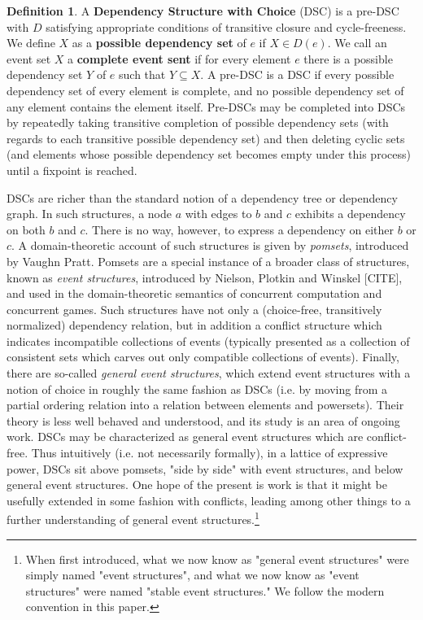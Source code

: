 \documentclass[hoptionsi,review,format=acmsmall]{acmart}
\theoremstyle{definition}
\newtheorem{definition}{Definition}[section]
\begin{document}
\begin{definition}
A \textbf{Dependency Structure with Choice} (DSC) is a pre-DSC with \(D\) satisfying  appropriate conditions of transitive closure and cycle-freeness. We define \(X\) as a \textbf{possible dependency set} of \(e\) if \(X \in D(e)\). We call an event set \(X\) a \textbf{complete event sent} if for every element \(e\) there is a possible dependency set \(Y\) of \(e\) such that \(Y \subseteq X\). A pre-DSC is a DSC if every possible dependency set of every element is complete, and no possible dependency set of any element contains the element itself. Pre-DSCs may be completed into DSCs by repeatedly taking transitive completion of possible dependency sets (with regards to each transitive possible dependency set) and then deleting cyclic sets (and elements whose possible dependency set becomes empty under this process) until a fixpoint is reached.
\end{definition}

DSCs are richer than the standard notion of a dependency tree or dependency graph. In such structures, a node \(a\) with edges to \(b\) and \(c\) exhibits a dependency on both \(b\) and \(c\). There is no way, however, to express a dependency on either \(b\) or \(c\). A domain-theoretic account of such structures is given by \textit{pomsets}, introduced by Vaughn Pratt. Pomsets are a special instance of a broader class of structures, known as \textit{event structures}, introduced by Nielson, Plotkin and Winskel [CITE], and used in the domain-theoretic semantics of concurrent computation and concurrent games. Such structures have not only a (choice-free, transitively normalized) dependency relation, but in addition a conflict structure which indicates incompatible collections of events (typically presented as a collection of consistent sets which carves out only compatible collections of events). Finally, there are so-called \textit{general event structures}, which extend event structures with a notion of choice in roughly the same fashion as DSCs (i.e. by moving from a partial ordering relation into a relation between elements and powersets). Their theory is less well behaved and understood, and its study is an area of ongoing work. DSCs may be characterized as general event structures which are conflict-free. Thus intuitively (i.e. not necessarily formally), in a lattice of expressive power, DSCs sit above pomsets, "side by side" with event structures, and below general event structures. One hope of the present is work is that it might be usefully extended in some fashion with conflicts, leading among other things to a further understanding of general event structures.\footnote{When first introduced, what we now know as "general event structures" were simply named "event structures", and what we now know as "event structures" were named "stable event structures." We follow the modern convention in this paper.}
\end{document}
